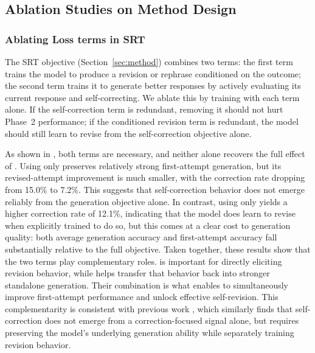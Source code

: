 \clearpage
\subsection{Ablation Studies on \ours{} Method Design}
\subsubsection{Ablating Loss terms in SRT}
The SRT objective \lsrt{} (Section~\ref{sec:method}) combines two terms: the first term \lrev{} trains the model to produce a revision or rephrase conditioned on the outcome; the second term \lgen{} trains it to generate better responses by actively evaluating its current response and self-correcting. We ablate this by training with each term alone. If the self-correction term is redundant, removing it should not hurt Phase~2 performance; if the conditioned revision term is redundant, the model should still learn to revise from the self-correction objective alone.

As shown in , both terms are necessary, and neither alone recovers the full effect of \sft{}. Using only \lgen{} preserves relatively strong first-attempt generation, but its revised-attempt improvement is much smaller, with the correction rate dropping from 15.0\% to 7.2\%. This suggests that self-correction behavior does not emerge reliably from the generation objective alone. In contrast, using only \lrev{} yields a higher correction rate of 12.1\%, indicating that the model does learn to revise when explicitly trained to do so, but this comes at a clear cost to generation quality: both average generation accuracy and first-attempt accuracy fall substantially relative to the full \sft{} objective. Taken together, these results show that the two terms play complementary roles. \lrev{} is important for directly eliciting revision behavior, while \lgen{} helps transfer that behavior back into stronger standalone generation. Their combination is what enables \sft{} to simultaneously improve first-attempt performance and unlock effective self-revision. This complementarity is consistent with previous work 
\citep{kumar2024traininglanguagemodelsselfcorrect}, which similarly finds that self-correction does not emerge from a correction-focused signal alone, but requires preserving the model’s underlying generation ability while separately training revision behavior.



